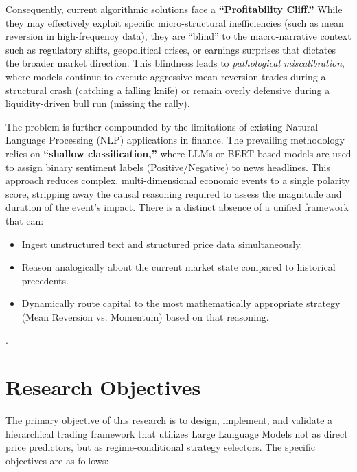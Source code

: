 \documentclass[12pt, a4paper]{report}
\begin{document}
Consequently, current algorithmic solutions face a \textbf{``Profitability Cliff.''} While they may effectively exploit specific micro-structural inefficiencies (such as mean reversion in high-frequency data), they are ``blind'' to the macro-narrative context such as regulatory shifts, geopolitical crises, or earnings surprises that dictates the broader market direction. This blindness leads to \textit{pathological miscalibration}, where models continue to execute aggressive mean-reversion trades during a structural crash (catching a falling knife) or remain overly defensive during a liquidity-driven bull run (missing the rally).

The problem is further compounded by the limitations of existing Natural Language Processing (NLP) applications in finance. The prevailing methodology relies on \textbf{``shallow classification,''} where LLMs or BERT-based models are used to assign binary sentiment labels (Positive/Negative) to news headlines. This approach reduces complex, multi-dimensional economic events to a single polarity score, stripping away the causal reasoning required to assess the magnitude and duration of the event's impact. There is a distinct absence of a unified framework that can:

\begin{itemize}
    \item Ingest unstructured text and structured price data simultaneously.
    \item Reason analogically about the current market state compared to historical precedents.
    \item Dynamically route capital to the most mathematically appropriate strategy (Mean Reversion vs. Momentum) based on that reasoning.
\end{itemize}.


\section{Research Objectives}


The primary objective of this research is to design, implement, and validate a hierarchical trading framework that utilizes Large Language Models not as direct price predictors, but as regime-conditional strategy selectors. The specific objectives are as follows:
\end{document}
